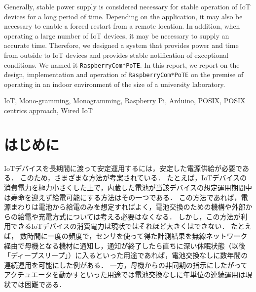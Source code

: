 \begin{eabstract}
Generally, stable power supply is considered necessary for stable operation of IoT devices for a long period of time.
Depending on the application, it may also be necessary to enable a forced restart from a remote location.
In addition, when operating a large number of IoT devices, it may be necessary to supply an accurate time.
Therefore, we designed a system that provides power and time from outside to IoT devices and provides stable notification of exceptional conditions. We named it {\tt Raspberry\-Com*PoTE}.
In this report, we report on the design, implementation and operation of {\tt Raspberry\-Com*PoTE} on the premise of operating in an indoor environment of the size of a university laboratory.

\end{eabstract}

\begin{ekeyword}
IoT, Mono-gramming, Monogramming, Raspberry Pi, Arduino, POSIX, POSIX centrics approach, Wired IoT
\end{ekeyword}

\maketitle




\section{はじめに}
\label{sec:01introduction}

IoTデバイスを長期間に渡って安定運用するには，安定した電源供給が必要である．
このため，さまざまな方法が考案されている．
たとえば，IoTデバイスの消費電力を極力小さくした上で，内蔵した電池が当該デバイスの想定運用期間中は寿命を迎えず給電可能にする方法はその一つである．
この方法であれば，電源まわりは電池から給電のみを想定すればよく，電池交換のための機構や外部からの給電や充電方式については考える必要はなくなる．
しかし，この方法が利用できるIoTデバイスの消費電力は現状ではそれほど大きくはできない．
たとえば，
数時間に一度の頻度で，センサを使って得た計測結果を無線ネットワーク経由で母機となる機材に通知し，通知が終了したら直ちに深い休眠状態（以後「ディープスリープ」）に入るといった用途であれば，電池交換なしに数年間の連続運用を可能にした例がある．
一方，母機からの非同期の指示にしたがってアクチュエータを動かすといった用途では電池交換なしに年単位の連続運用は現状では困難である．

